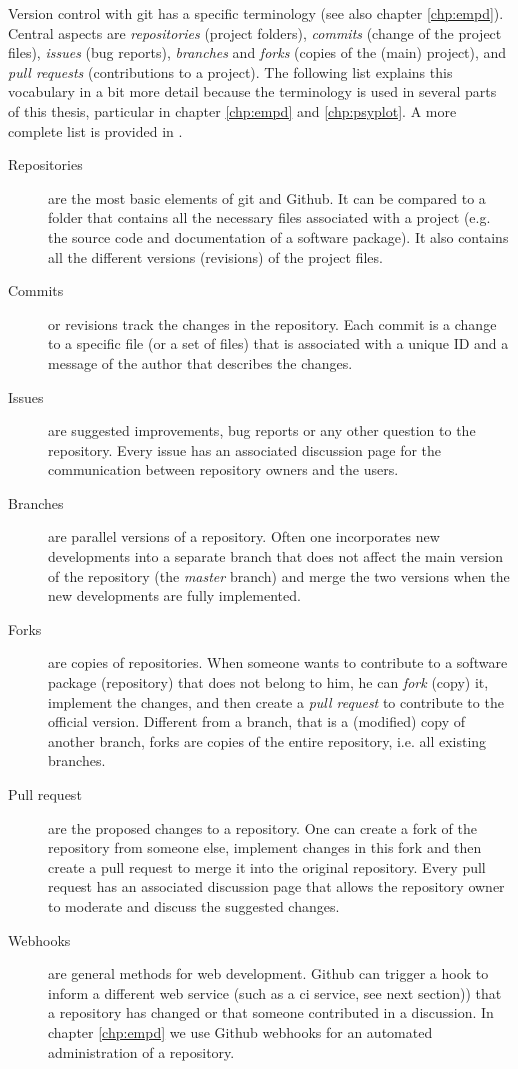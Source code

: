 \documentclass[
11pt, %
english, %
singlespacing, %
headsepline, %
]{MastersDoctoralThesis} %
\begin{document}
\begin{NoHyper}
\begin{refsection}
Version control with git has a specific terminology (see also chapter \ref{chp:empd}). Central aspects are \textit{repositories} (project folders), \textit{commits} (change of the project files), \textit{issues} (bug reports), \textit{branches} and \textit{forks} (copies of the (main) project), and \textit{pull requests} (contributions to a project). The following list explains this vocabulary in a bit more detail because the terminology is used in several parts of this thesis, particular in chapter \ref{chp:empd} and \ref{chp:psyplot}. A more complete list is provided in \cite{Github2019}.

\begin{description}
	\item[Repositories] are the most basic elements of git and Github. It can be compared to a folder that contains all the necessary files associated with a project (e.g. the source code and documentation of a software package). It also contains all the different versions (revisions) of the project files.
	\item[Commits] or revisions track the changes in the repository. Each commit is a change to a specific file (or a set of files) that is associated with a unique ID and a message of the author that describes the changes.
	\item[Issues] are suggested improvements, bug reports or any other question to the repository. Every issue has an associated discussion page for the communication between repository owners and the users.
	\item[Branches] are parallel versions of a repository. Often one incorporates new developments into a separate branch that does not affect the main version of the repository (the \textit{master} branch) and merge the two versions when the new developments are fully implemented.
	\item[Forks] are copies of repositories. When someone wants to contribute to a software package (repository) that does not belong to him, he can \textit{fork} (copy) it, implement the changes, and then create a \textit{pull request} to contribute to the official version. Different from a branch, that is a (modified) copy of another branch, forks are copies of the entire repository, i.e. all existing branches.
	\item[Pull request] are the proposed changes to a repository. One can create a fork of the repository from someone else, implement changes in this fork and then create a pull request to merge it into the original repository. Every pull request has an associated discussion page that allows the repository owner to moderate and discuss the suggested changes.
	\item[Webhooks] are general methods for web development. Github can trigger a hook to inform a different web service (such as a \gls{ci} service, see next section)) that a repository has changed or that someone contributed in a discussion. In chapter \ref{chp:empd} we use Github webhooks for an automated administration of a repository.
\end{description}



\end{refsection}
\end{NoHyper}
\end{document}
